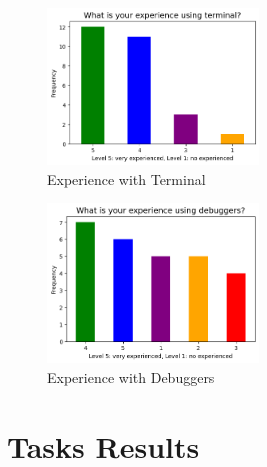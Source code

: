 \begin{figure}[!h]
    \centering
    \includegraphics[width=0.5\textwidth]{figures/experience-terminal.png}
    \caption{Experience with Terminal}
    \label{fig:exp-terminal}
\end{figure}

\begin{figure}[!h]
    \centering
    \includegraphics[width=0.5\textwidth]{figures/experience-debuggers.png}
    \caption{Experience with Debuggers}
    \label{fig:exp-deb}
\end{figure}

\section{Tasks Results}
\label{sec:tasks-results}

